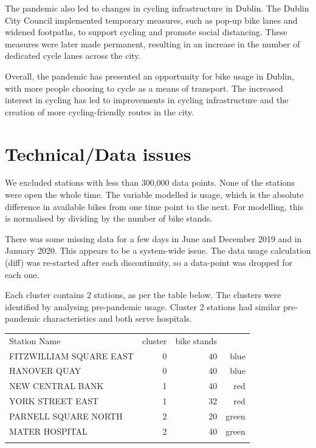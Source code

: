 \documentclass[11pt, singlecolumn, citestyle=authoryear]{elegantbook}
\begin{document}
The pandemic also led to changes in cycling infrastructure in Dublin. The Dublin City Council implemented temporary measures, such as pop-up bike lanes and widened footpaths, to support cycling and promote social distancing. These measures were later made permanent, resulting in an increase in the number of dedicated cycle lanes across the city.

Overall, the pandemic  has presented an opportunity for bike usage in Dublin, with more people choosing to cycle as a means of transport. The increased interest in cycling has led to improvements in cycling infrastructure and the creation of more cycling-friendly routes in the city.


	
\section{Technical/Data issues}
We excluded stations with less than 300,000 data points.   None of the stations were open the whole time. The variable modelled is usage, which is the absolute difference in available bikes from one time point to the next.  For modelling, this is normalised by dividing by the number of bike stands.

There was some missing data for a few days in June and December 2019 and in January 2020.  This appears to be a system-wide issue.  The data usage calculation (diff) was re-started after each discontinuity, so a data-point was dropped for each one.

Each cluster contains 2 stations, as per the table below.   The clusters were identified by analysing pre-pandemic usage. Cluster 2 stations had similar pre-pandemic characteristics and both serve hospitals. 



	
\begin{table}[h]
	\begin{center}
	\begin{tabular}{lrrr}
		Station Name & cluster & bike stands\\
		FITZWILLIAM SQUARE EAST & 0 & 40 & blue\\
		HANOVER QUAY & 0 & 40 & blue\\
		NEW CENTRAL BANK & 1 & 40  & red\\
		YORK STREET EAST & 1 & 32  & red\\
		PARNELL SQUARE NORTH & 2 & 20 & green\\
		MATER HOSPITAL & 2 & 40 & green\\
		\label{tbl:stations}
	\end{tabular} 
\end{center}
\end{table}
\end{document}
